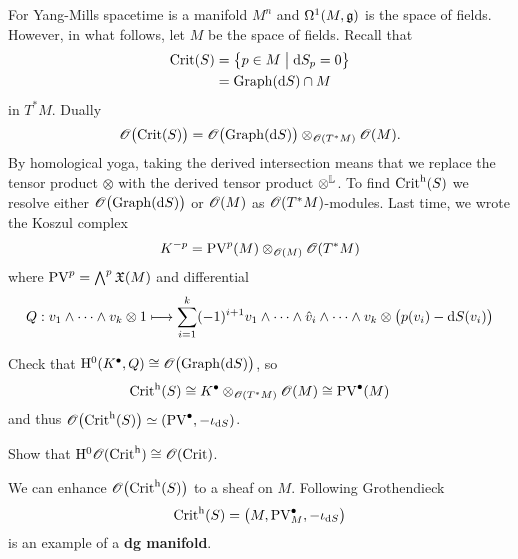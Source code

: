 For Yang-Mills spacetime is a manifold $M^n$ and $\Omega^1(M, \mathfrak{g})$ is the space of fields.
However, in what follows, let $M$ be the space of fields.
Recall that
\begin{align*}
  \operatorname{Crit}(S) &= \bigl\{ p \in M \bigm| \mathrm{d} S_p = 0 \bigr\} \\
           &= \operatorname{Graph} (\mathrm{d} S) \cap M
\end{align*}
in $T^* M$. Dually
\begin{equation*}
  \mathscr{O} \bigl( \operatorname{Crit}(S) \bigr)
  = \mathscr{O} \bigl( \operatorname{Graph} (\mathrm{d} S) \bigr) \otimes_{\mathscr{O}(T^* M)} \mathscr{O}(M).
\end{equation*}
By homological yoga, taking the derived intersection means that we replace the tensor product $\otimes$ with the derived tensor product $\otimes^{\mathbb{L}}$.
To find $\operatorname{Crit}^{\mathrm{h}} (S)$ we resolve either $\mathscr{O} \bigl( \operatorname{Graph} (\mathrm{d} S) \bigr)$ or $\mathscr{O}(M)$ as $\mathscr{O}(T^* M)$-modules. 
Last time, we wrote the Koszul complex
\begin{equation*}
  K^{-p} = \operatorname{PV}^p (M) \otimes_{\mathscr{O}(M)} \mathscr{O} (T^* M)
\end{equation*}
where $\operatorname{PV}^p = \bigwedge^p \mathfrak{X}(M)$ and differential
\begin{equation*}
  Q : v_1 \wedge \dots \wedge v_k \otimes 1 \longmapsto
  \sum_{i=1}^k (-1)^{i+1} v_1 \wedge \dots \wedge \hat{v}_i \wedge \dots \wedge v_k
  \otimes \bigl( p(v_i) - \mathrm{d} S(v_i) \bigr)
\end{equation*}

\begin{exercise}
  Check that $\mathrm{H}^0 (K^{\bullet}, Q) \cong \mathscr{O} \bigl( \operatorname{Graph} (\mathrm{d} S) \bigr)$, so
  \begin{equation*}
    \operatorname{Crit}^{\mathrm{h}} (S) \cong K^{\bullet} \otimes_{\mathscr{O}(T^* M)} \mathscr{O} (M) \cong \operatorname{PV}^{\bullet} (M)
  \end{equation*}
  and thus $\mathscr{O} \bigl( \operatorname{Crit}^{\mathrm{h}}(S) \bigr) \simeq (\operatorname{PV}^\bullet, - \iota_{\mathrm{d} S})$.
\end{exercise}

\begin{exercise}
   Show that $\mathrm{H}^0 \mathscr{O}( \operatorname{Crit}^{\mathrm{h}} ) \cong \mathscr{O} (\operatorname{Crit})$.
\end{exercise}

We can enhance $\mathscr{O} \bigl( \operatorname{Crit}^{\mathrm{h}} (S) \bigr)$ to a sheaf on $M$. Following Grothendieck
\begin{equation*}
  \operatorname{Crit}^{\mathrm{h}}(S) = \bigl( M, \operatorname{PV}_M^\bullet, - \iota_{\mathrm{d} S} \bigr)
\end{equation*}
is an example of a \textbf{dg manifold}.

